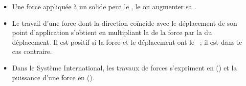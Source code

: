 \begin{itemize}
    \item Une force appliquée à un solide peut le \dotline{3cm}, le
          \dotline{3cm} ou augmenter sa \dotline{3cm}.
          
    \item Le travail d'une force dont la direction coïncide avec le déplacement
          de son point d'application s'obtient en multipliant la \dotline{3cm}
          de la force par la \dotline{3cm} du déplacement. Il est positif si la
          force et le déplacement ont le \dotline{3cm}~; il est \dotline{3cm}
          dans le cas contraire.
          
    \item Dans le Système International, les travaux de forces s'expriment en
          \dotline{3cm} (\dotline{1cm}) et la puissance d'une force en
          \dotline{3cm} (\dotline{1cm}).
\end{itemize}

